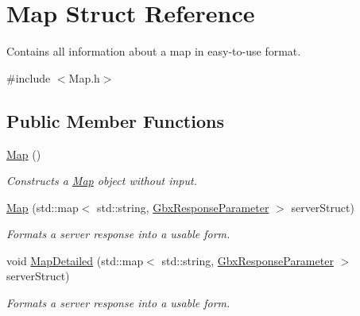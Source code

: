 \hypertarget{structMap}{\section{Map Struct Reference}
\label{structMap}
}


Contains all information about a map in easy-\/to-\/use format.  




{\ttfamily \#include $<$Map.\-h$>$}

\subsection*{Public Member Functions}
\begin{DoxyCompactItemize}
\item 
\hypertarget{structMap_a0f5ad0fd4563497b4214038cbca8b582}{\hyperlink{structMap_a0f5ad0fd4563497b4214038cbca8b582}{Map} ()}\label{structMap_a0f5ad0fd4563497b4214038cbca8b582}

\begin{DoxyCompactList}\small\item\em Constructs a \hyperlink{structMap}{Map} object without input. \end{DoxyCompactList}\item 
\hyperlink{structMap_a95a2cda9b2746b5ba75e811930559c1f}{Map} (std\-::map$<$ std\-::string, \hyperlink{classGbxResponseParameter}{Gbx\-Response\-Parameter} $>$ server\-Struct)
\begin{DoxyCompactList}\small\item\em Formats a server response into a usable form. \end{DoxyCompactList}\item 
void \hyperlink{structMap_ac8e78e5d9ba3951db798736fc33e907e}{Map\-Detailed} (std\-::map$<$ std\-::string, \hyperlink{classGbxResponseParameter}{Gbx\-Response\-Parameter} $>$ server\-Struct)
\begin{DoxyCompactList}\small\item\em Formats a server response into a usable form. \end{DoxyCompactList}\end{DoxyCompactItemize}
